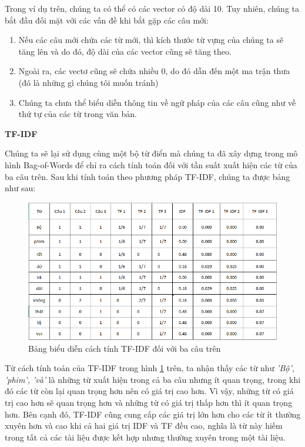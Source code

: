 Trong ví dụ trên, chúng ta có thể có các vector có độ dài 10. Tuy nhiên, chúng ta bắt đầu đối mặt với các vấn đề khi bắt gặp các câu mới:
\begin{enumerate}
  \item Nếu các câu mới chứa các từ mới, thì kích thước từ vựng của chúng ta sẽ tăng lên và do đó, độ dài của các vector cũng sẽ tăng theo.
  \item Ngoài ra, các vectơ cũng sẽ chứa nhiều 0, do đó dẫn đến một ma trận thưa (đó là những gì chúng tôi muốn tránh)
  \item Chúng ta chưa thể biểu diễn thông tin về ngữ pháp của các câu cũng như về thứ tự của các từ trong văn bản.
\end{enumerate}

\textbf{\textsc{TF-IDF}}

Chúng ta sẽ lại sử dụng cùng một bộ từ điển mà chúng ta đã xây dựng trong mô hình Bag-of-Words để chỉ ra cách tính toán đối với tần suất xuất hiện các từ của ba câu trên. Sau khi tính toán theo phương pháp TF-IDF, chúng ta được bảng như sau:

\begin{figure}[!h]
	\centering
		\includegraphics[width=1\columnwidth]{books/artificial-neural-network/chapter05/figure/tf-idf.PNG}
        \caption{Bảng biểu diễn cách tính TF-IDF đối với ba câu trên}
        \label{fig:sec6:tf-idf}
\end{figure}

Từ cách tính toán của TF-IDF trong hình \ref{fig:sec6:tf-idf} trên, ta nhận thấy các từ như \textit{'Bộ', 'phim', 'và' }  là những từ xuất hiện trong cả ba câu nhưng ít quan trọng, trong khi đó các từ còn lại quan trọng hơn nên có giá trị cao hơn. Vì vậy, những từ có giá trị cao hơn sẽ quan trọng hơn và những từ có giá trị thấp hơn thì ít quan trọng hơn. Bên cạnh đó, TF-IDF cũng cung cấp các giá trị lớn hơn cho các từ ít thường xuyên hơn và cao khi cả hai giá trị IDF và TF đều cao, nghĩa là từ này hiếm trong tất cả các tài liệu được kết hợp nhưng thường xuyên trong một tài liệu.

